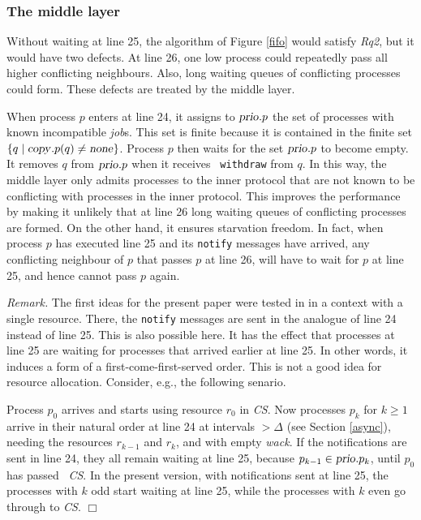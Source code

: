 \documentclass[10pt]{article} \usepackage[english]{babel}
\newenvironment{remark}{\medbreak\noindent\emph{Remark.}}{\boks}
\def\boks  {\mbox{$\Box$}}
\def\S #1/{\mbox {\textsl{#1}}}
\def\T #1/{\mbox {\texttt{#1}}}
\begin{document}
\subsubsection{The middle layer} \label{middle}

Without waiting at line 25, the algorithm of Figure \ref{fifo} would
satisfy \S Rq2/, but it would have two defects. At line 26, one low
process could repeatedly pass all higher conflicting neighbours. Also,
long waiting queues of conflicting processes could form.  These
defects are treated by the middle layer.

When process $p$ enters at line 24, it assigns to $\S prio/.p$ the set
of processes with known incompatible \S job/s.  This set is finite
because it is contained in the finite set $\{ q \mid \S copy/.p(q)\ne
\S none/\}$.  Process $p$ then waits for the set $\S prio/.p$ to
become empty. It removes $q$ from $\S prio/.p$ when it receives \T
withdraw/ from $q$. In this way, the middle layer only admits
processes to the inner protocol that are not known to be conflicting
with processes in the inner protocol.  This improves the performance
by making it unlikely that at line 26 long waiting queues of
conflicting processes are formed. On the other hand, it ensures
starvation freedom. In fact, when process $p$ has executed line 25 and
its \T notify/ messages have arrived, any conflicting neighbour of $p$
that passes $p$ at line 26, will have to wait for $p$ at line 25, and
hence cannot pass $p$ again.

\begin{remark} 
  The first ideas for the present paper were tested in \cite{whh464}
  in a context with a single resource.  There, the \T notify/ messages
  are sent in the analogue of line 24 instead of line 25. This is also
  possible here. It has the effect that processes at line 25 are
  waiting for processes that arrived earlier at line 25. In other
  words, it induces a form of a first-come-first-served order. This is
  not a good idea for resource allocation. Consider, e.g., the
  following senario.

  Process $p_0$ arrives and starts using resource $r_0$ in \S CS/. Now
  processes $p_k$ for $k\geq 1$ arrive in their natural order at line
  24 at intervals $>\Delta$ (see Section \ref{async}), needing the
  resources $r_{k-1}$ and $r_k$, and with empty \S wack/. If the
  notifications are sent in line 24, they all remain waiting at line
  25, because $p_{k-1}\in\S prio/.p_k$, until $p_0$ has passed \S
  CS/. In the present version, with notifications sent at line 25, the
  processes with $k$ odd start waiting at line 25, while the processes
  with $k$ even go through to \S CS/.
\end{remark}
\end{document}
